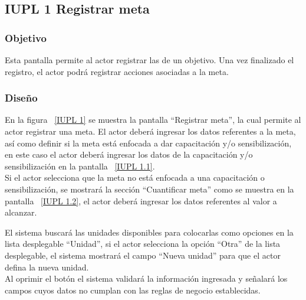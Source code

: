 \subsection{IUPL 1 Registrar meta}
                     
\subsubsection{Objetivo}

   Esta pantalla permite al actor registrar las  de un objetivo. Una vez finalizado el registro, el actor podrá registrar acciones asociadas a la meta.

	
\subsubsection{Diseño}

  En la figura ~\ref{IUPL 1} se muestra la pantalla ``Registrar meta'',
  la cual permite al actor registrar una meta. 
  El actor deberá ingresar los datos referentes a la meta, así como definir si la meta está enfocada a dar capacitación y/o sensibilización, en este caso el 
  actor deberá ingresar los datos de la capacitación y/o sensibilización en la pantalla ~\ref{IUPL 1.1}.\\
  
  Si el actor selecciona que la meta no está enfocada a una capacitación o sensibilización, se mostrará la sección ``Cuantificar meta'' como se muestra en la pantalla ~\ref{IUPL 1.2}, el actor 
  deberá ingresar los datos referentes al valor a alcanzar.\\
 
  
  El sistema buscará las unidades disponibles para colocarlas como opciones en la lista desplegable ``Unidad'', si el actor selecciona la opción ``Otra'' de la lista desplegable, el sistema mostrará
  el campo ``Nueva unidad'' para que el actor defina la nueva unidad.\\
  
  Al oprimir el botón  el sistema validará la información ingresada y señalará los campos cuyos datos no cumplan con las reglas de negocio establecidas.\\
  
